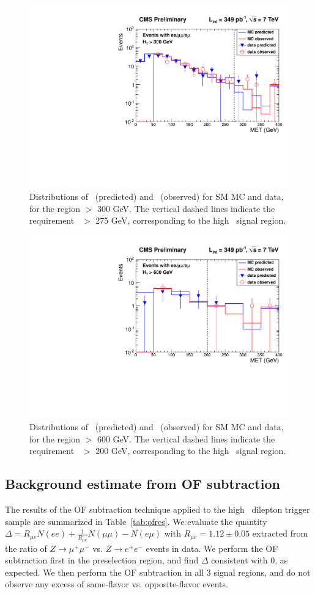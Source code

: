 \begin{figure}[tbh]
\begin{center}
\includegraphics[width=0.6\linewidth]{plots/victory_met275_ht300_349pb.pdf}
\caption{\label{fig:v2}\protect 
Distributions of \ptll\ (predicted) and \met\ (observed) for 
SM MC and data, for the region \Ht $>$ 300 GeV. 
The vertical dashed lines indicate the requirement \met\ $>$ 275 GeV, corresponding to the high \met\ signal region.
}
\end{center}
\end{figure}

\begin{figure}[tbh]
\begin{center}
\includegraphics[width=0.6\linewidth]{plots/victory_met200_ht600_349pb.pdf}
\caption{\label{fig:vic3}\protect 
Distributions of \ptll\ (predicted) and \met\ (observed) for 
SM MC and data, for the region \Ht $>$ 600 GeV. 
The vertical dashed lines indicate the requirement \met\ $>$ 200 GeV, corresponding to the high \Ht\ signal region.
}
\end{center}
\end{figure}

\subsection{Background estimate from OF subtraction}
\label{sec:ofres}

The results of the OF subtraction technique applied to the high \pt\ dilepton trigger sample are summarized in Table~\ref{tab:ofres}. 
We evaluate the quantity $\Delta = R_{\mu e}N(ee) + \frac{1}{R_{\mu e}}N(\mu\mu) - N(e\mu)$ with $R_{\mu e} = 1.12 \pm 0.05$
extracted from the ratio of $Z \to \mu^+\mu^-$ vs. $Z \to e^+e^-$ events in data.
We perform the OF subtraction first in the preselection region, and find $\Delta$ consistent with 0, as expected.
We then perform the OF subtraction in all 3 signal regions, and do not observe any excess of same-flavor vs. opposite-flavor events.

